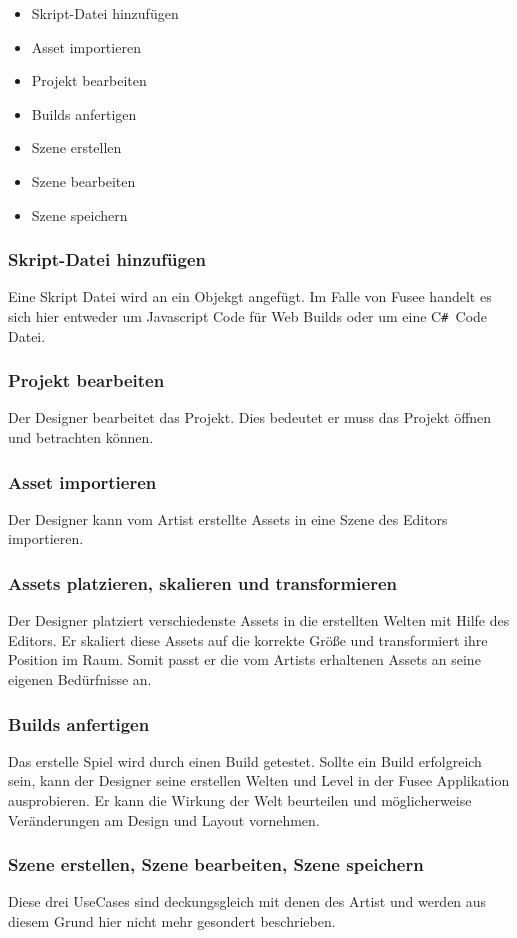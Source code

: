 \documentclass[pagesize, paper=a4, fontsize=12pt, titlepage=true, headings=small, headnosepline, abstractoff, liststotoc, nochapterprefix, plainheadsepline, twoside]{scrreprt}
\newcommand{\CSS}{C\texttt{\# }}
\begin{document}
\begin{itemize}
\item Skript-Datei hinzufügen
\item Asset importieren
\item Projekt bearbeiten
\item Builds anfertigen
\item Szene erstellen
\item Szene bearbeiten
\item Szene speichern
\end{itemize}

\subsubsection{Skript-Datei hinzufügen}
Eine Skript Datei wird an ein Objekgt angefügt. Im Falle von Fusee handelt es sich hier entweder um Javascript Code für Web Builds oder um eine \CSS Code Datei.
\subsubsection{Projekt bearbeiten}
Der Designer bearbeitet das Projekt. Dies bedeutet er muss das Projekt öffnen und betrachten können.
\subsubsection{Asset importieren}
Der Designer kann vom Artist erstellte Assets in eine Szene des Editors importieren. 
\subsubsection{Assets platzieren, skalieren und transformieren}
Der Designer platziert verschiedenste Assets in die erstellten Welten mit Hilfe des Editors. Er skaliert diese Assets auf die korrekte Größe und transformiert ihre Position im Raum. Somit passt er die vom Artists erhaltenen Assets an seine eigenen Bedürfnisse an. 
\subsubsection{Builds anfertigen}
Das erstelle Spiel wird durch einen Build getestet. Sollte ein Build erfolgreich sein, kann der Designer seine erstellen Welten und Level in der Fusee Applikation ausprobieren. Er kann die Wirkung der Welt beurteilen und möglicherweise Veränderungen am Design und Layout vornehmen.
\subsubsection{Szene erstellen, Szene bearbeiten, Szene speichern}
Diese drei UseCases sind deckungsgleich mit denen des Artist und werden aus diesem Grund hier nicht mehr gesondert beschrieben.
\end{document}
